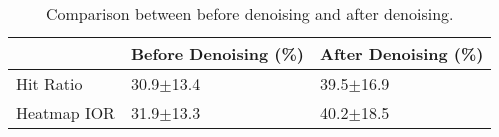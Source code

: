 
\begin{table}[h!]
\centering
\caption{Comparison between before denoising and after denoising. }
\begin{tabular}{C{2.3cm}C{2.6cm}C{2.6cm}}
\hline
            & Before Denoising (\%)    & After Denoising (\%)   \\ \hline
Hit Ratio   & 30.9$\pm$13.4     & 39.5$\pm$16.9    \\ \hline
Heatmap IOR & 31.9$\pm$13.3     & 40.2$\pm$18.5    \\ \hline
\end{tabular}
\label{gaze-denoise-table}
\end{table}